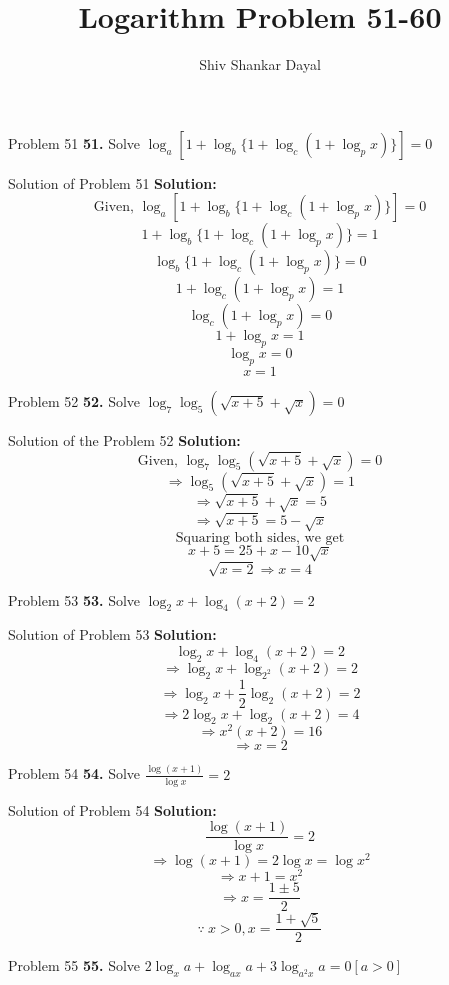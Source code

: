\documentclass[aspectratio=1610,8pt]{beamer}
\title{Logarithm Problem 51-60}
\author[Shiv Shankar Dayal]{Shiv Shankar Dayal}
\begin{document}
\begin{frame}
  \titlepage
\end{frame}
\begin{frame}{Problem 51}
  \textbf{51.} Solve $\log_a[1 + \log_b\{1 + \log_c(1 + \log_px)\}] = 0$
\end{frame}
\begin{frame}{Solution of Problem 51}
  \textbf{Solution:} $$\text{Given,~}\log_a[1 + \log_b\{1 + \log_c(1 + \log_px)\}] = 0$$
  $$1 + \log_b\{1 + \log_c(1 + \log_px)\} = 1$$
  $$\log_b\{1 + \log_c(1 + \log_px)\} = 0$$
  $$1 + \log_c(1 + \log_px) = 1$$
  $$\log_c(1 + \log_px) = 0$$
  $$1 + \log_px = 1$$
  $$\log_px = 0$$
  $$x = 1$$
\end{frame}
\begin{frame}{Problem 52}
  \textbf{52.} Solve $\log_7\log_5(\sqrt{x + 5} + \sqrt{x}) = 0$
\end{frame}
\begin{frame}{Solution of the Problem 52}
  \textbf{Solution:} $$\text{Given,~}\log_7\log_5(\sqrt{x + 5} + \sqrt{x}) = 0$$
  $$\Rightarrow \log_5(\sqrt{x + 5} + \sqrt{x}) = 1$$
  $$\Rightarrow \sqrt{x + 5} + \sqrt{x} = 5$$
  $$\Rightarrow \sqrt{x + 5} = 5 - \sqrt{x}$$
  $$\text{Squaring both sides, we get}$$
  $$x + 5 = 25 + x - 10\sqrt{x}$$
  $$\sqrt{x = 2}\Rightarrow x = 4$$
\end{frame}
\begin{frame}{Problem 53}
  \textbf{53.} Solve $\log_2x + \log_4(x + 2) = 2$
\end{frame}
\begin{frame}{Solution of Problem 53}
  \textbf{Solution:} $$\log_2x + \log_4(x + 2) = 2$$
  $$\Rightarrow \log_2x + \log_{2^2}(x + 2) = 2$$
  $$\Rightarrow \log_2x + \frac{1}{2}\log_2(x + 2) = 2$$
  $$\Rightarrow 2\log_2x + \log_2(x + 2) = 4$$
  $$\Rightarrow x^2(x + 2) = 16$$
  $$\Rightarrow x = 2$$
\end{frame}
\begin{frame}{Problem 54}
  \textbf{54.} Solve $\frac{\log(x + 1)}{\log x} = 2$
\end{frame}
\begin{frame}{Solution of Problem 54}
  \textbf{Solution:} $$\frac{\log(x + 1)}{\log x} = 2$$
  $$\Rightarrow \log(x + 1) = 2\log x = \log x^2$$
  $$\Rightarrow x + 1 = x^2$$
  $$\Rightarrow x = \frac{1 \pm 5}{2}$$
  $$\because~ x>0, x = \frac{1 + \sqrt{5}}{2}$$
\end{frame}
\begin{frame}{Problem 55}
  \textbf{55.} Solve $2\log_xa + \log_{ax}a + 3\log_{a^2x}a = 0[a > 0]$
\end{frame}
\end{document}
